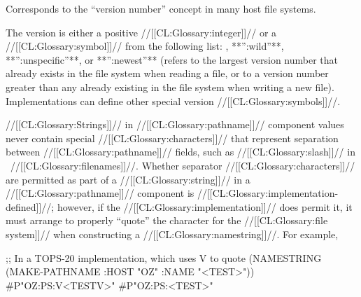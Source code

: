
Corresponds to the ``version number'' concept in many host file systems.

The version is either a positive //[[CL:Glossary:integer]]// 
or a //[[CL:Glossary:symbol]]// from the following list:
\nil, **'':wild''**, **'':unspecific''**, or **'':newest''**
(refers to the largest version number that already exists in 
the file system when reading a file, or to
a version number
greater than any already existing in the file system
when writing a new file).  Implementations 
can define other special version //[[CL:Glossary:symbols]]//.



\endsubsubsection%

\endSubsection%





//[[CL:Glossary:Strings]]// in //[[CL:Glossary:pathname]]// component values 
never contain special //[[CL:Glossary:characters]]// that represent
separation between //[[CL:Glossary:pathname]]// fields, 
such as //[[CL:Glossary:slash]]// in \Unix\ //[[CL:Glossary:filenames]]//.
Whether separator //[[CL:Glossary:characters]]// are permitted as 
part of a //[[CL:Glossary:string]]// in a //[[CL:Glossary:pathname]]// component
is //[[CL:Glossary:implementation-defined]]//; 
however, if the //[[CL:Glossary:implementation]]// does permit it, 
it must arrange to properly ``quote'' the character for the 
//[[CL:Glossary:file system]]// when constructing a //[[CL:Glossary:namestring]]//.
For example,

\code
 ;; In a TOPS-20 implementation, which uses {\hat}V to quote 
 (NAMESTRING (MAKE-PATHNAME :HOST "OZ" :NAME "<TEST>"))
\EV #P"OZ:PS:{\hat}V<TEST{\hat}V>"
\NV #P"OZ:PS:<TEST>"
\endcode





 
\endsubsubsubsection%




